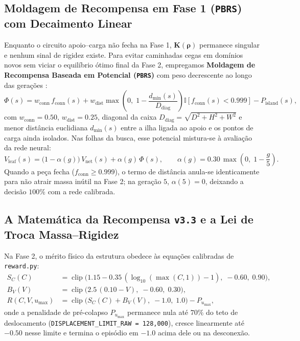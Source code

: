 \documentclass[11pt,a4paper]{article}
\begin{document}
\subsection{Moldagem de Recompensa em Fase 1 (\texttt{PBRS}) com Decaimento Linear}

Enquanto o circuito apoio--carga não fecha na Fase 1, $\mathbf{K}(\boldsymbol{\rho})$ permanece singular e nenhum sinal de rigidez existe. Para evitar caminhadas cegas em domínios novos sem viciar o equilíbrio ótimo final da Fase 2, empregamos \textbf{Moldagem de Recompensa Baseada em Potencial (\texttt{PBRS})} com peso decrescente ao longo das gerações \citep{wang2020warmstart,muller2025improving}:
\begin{equation}
\Phi(s) = w_{\mathrm{conn}}\, f_{\mathrm{conn}}(s)
+ w_{\mathrm{dist}}\max\!\left(0,\; 1 - \frac{d_{\min}(s)}{D_{\mathrm{diag}}}\right)\mathbb{I}[f_{\mathrm{conn}}(s) < 0.999]
- P_{\mathrm{island}}(s),
\end{equation}
com $w_{\mathrm{conn}} = 0.50$, $w_{\mathrm{dist}} = 0.25$, diagonal da caixa $D_{\mathrm{diag}} = \sqrt{D^2+H^2+W^2}$ e menor distância euclidiana $d_{\min}(s)$ entre a ilha ligada ao apoio e os pontos de carga ainda isolados. Nas folhas da busca, esse potencial mistura-se à avaliação da rede neural:
\begin{equation}
V_{\mathrm{leaf}}(s) = \big(1 - \alpha(g)\big)\,V_{\mathrm{net}}(s) + \alpha(g)\,\Phi(s), \qquad
\alpha(g) = 0.30\,\max\!\left(0,\; 1 - \frac{g}{5}\right).
\end{equation}
Quando a peça fecha ($f_{\mathrm{conn}} \ge 0.999$), o termo de distância anula-se identicamente para não atrair massa inútil na Fase 2; na geração $5$, $\alpha(5) = 0$, deixando a decisão $100\%$ com a rede calibrada.

\subsection{A Matemática da Recompensa \texttt{v3.3} e a Lei de Troca Massa--Rigidez}

Na Fase 2, o mérito físico da estrutura obedece às equações calibradas de \texttt{reward.py}:
\begin{align}
S_C(C) &= \operatorname{clip}\!\big(1.15 - 0.35\,(\log_{10}(\max(C, 1)) - 1),\; -0.60,\; 0.90\big), \\
B_V(V) &= \operatorname{clip}\!\big(2.5\,(0.10 - V),\; -0.60,\; 0.30\big), \\
R(C, V, u_{\max}) &= \operatorname{clip}\!\big(S_C(C) + B_V(V),\; -1.0,\; 1.0\big) - P_{u_{\max}},
\end{align}
onde a penalidade de pré-colapso $P_{u_{\max}}$ permanece nula até $70\%$ do teto de deslocamento (\texttt{DISPLACEMENT\_LIMIT\_RAW = 128,000}), cresce linearmente até $-0.50$ nesse limite e termina o episódio em $-1.0$ acima dele ou na desconexão.
\end{document}
